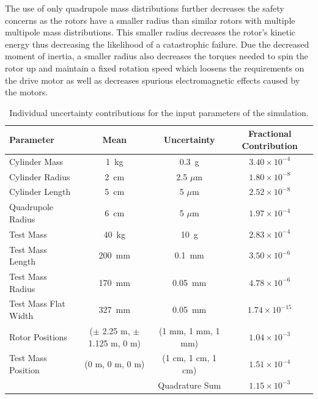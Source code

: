 \documentclass[superscriptaddress, twocolumn, prd]{revtex4-1}
\begin{document}
The use of only quadrupole mass distributions further decreases the safety concerns as the rotors have a smaller radius than similar rotors with multiple multipole mass distributions. This smaller radius decreases the rotor's kinetic energy thus decreasing the likelihood of a catastrophic failure. Due the decreased moment of inertia, a smaller radius also decreases the torques needed to spin the rotor up and maintain a fixed rotation speed which loosens the requirements on the drive motor as well as decreases spurious electromagnetic effects caused by the motors. 

\begin{widetext}
\begingroup
\setlength{\tabcolsep}{10pt} %
\renewcommand{\arraystretch}{1.5} %

\begin{table}[h!]
\begin{center}
\begin{tabular}{ |l|c|c|c| }
\hline
 Parameter & Mean & Uncertainty & Fractional Contribution\\
 \hline
Cylinder Mass & 1~kg & 0.3~g & $3.40\times10^{-4}$\\
Cylinder Radius & 2~cm & 2.5 $\mu$m & $1.80\times10^{-8}$\\
Cylinder Length & 5~cm & 5 $\mu$m & $2.52\times10^{-8}$\\
Quadrupole Radius & 6~cm & 5 $\mu$m &$1.97\times10^{-4}$\\
Test Mass & 40~kg & 10~g & $2.83\times10^{-4}$\\
Test Mass Length & 200~mm & 0.1~mm& $3.50\times10^{-6}$\\
Test Mass Radius & 170~mm & 0.05~mm& $4.78\times10^{-6}$\\
Test Mass Flat Width & 327~mm & 0.05~mm&$1.74\times10^{-15}$\\
Rotor Positions & ($\pm$ 2.25 m, $\pm$ 1.125 m, 0 m) & (1 mm, 1 mm, 1 mm) &$1.04\times10^{-3}$\\
Test Mass Position & (0 m, 0 m, 0 m) & (1 cm, 1 cm, 1 cm) &$1.51\times10^{-4}$\\
 \hline
 \hline
& &Quadrature Sum  &$1.15\times10^{-3}$\\
\hline
 \end{tabular}
 \caption{Individual uncertainty contributions for the input parameters of the simulation.}\label{uncert}
 \end{center}

\end{table}
\endgroup
\end{widetext}
\end{document}
